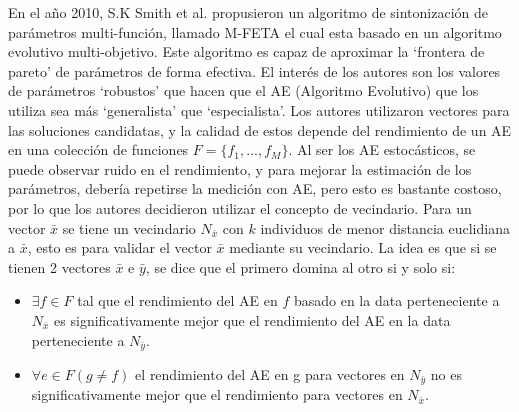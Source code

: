 \documentclass[letter, 10pt]{article}
\begin{document}
\begin{multicols}{2}
En el año 2010, S.K Smith et al.\cite{Smit2010AnMM} propusieron un algoritmo de sintonización de parámetros multi-función, llamado M-FETA el cual esta basado en un algoritmo evolutivo multi-objetivo. Este algoritmo es capaz de aproximar la `frontera de pareto' de parámetros de forma efectiva. El interés de los autores son los valores de parámetros `robustos' que hacen que el AE (Algoritmo Evolutivo) que los utiliza sea más `generalista' que `especialista'. Los autores utilizaron vectores para las soluciones candidatas, y la calidad de estos depende del rendimiento de un AE en una colección de funciones $F=\{f_{1},...,f_{M}\}$. Al ser los AE estocásticos, se puede observar ruido en el rendimiento, y para mejorar la estimación de los parámetros, debería repetirse la medición con AE, pero esto es bastante costoso, por lo que los autores decidieron utilizar el concepto de vecindario. Para un vector $\bar{x}$ se tiene un vecindario $N_{\bar{x}}$ con $k$ individuos de menor distancia euclidiana a $\bar{x}$, esto es para validar el vector $\bar{x}$ mediante su vecindario. La idea es que si se tienen 2 vectores $\bar{x}$ e $\bar{y}$, se dice que el primero domina al otro si y solo si:
\begin{itemize}
    \item $\exists f \in F$ tal que el rendimiento del AE en $f$ basado en la data perteneciente a $N_{\bar{x}}$ es significativamente mejor que el rendimiento del AE en la data perteneciente a $N_{\bar{y}}$.
    \item $\forall e \in F (g \neq f)$ el rendimiento del AE en g para vectores en $N_{\bar{y}}$ no es significativamente mejor que el rendimiento para vectores en $N_{\bar{x}}$.
\end{itemize}

\end{multicols}
\end{document}
